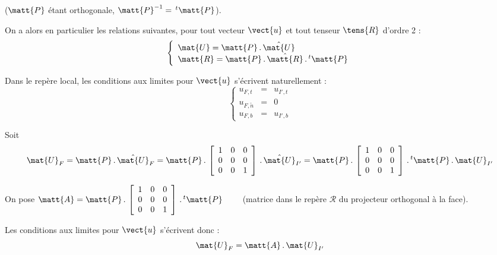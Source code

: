 ($\matt{P}$ \'etant orthogonale, $\matt{P}^{-1}=\,^t\matt{P}$).

On a alors en particulier les relations suivantes, pour tout vecteur $\vect{u}$
et tout tenseur $\tens{R}$ d'ordre 2 :\\
\begin{equation}
\left\{\begin{array}{l}
\mat{U} = \matt{P}\,.\,\hat{\mat{U}}\\
\matt{R}= \matt{P}\,.\,\hat{\matt{R}}\,.\,^t\matt{P}
\end{array}\right.
\end{equation}

Dans le rep\`ere local, les conditions aux limites pour $\vect{u}$ s'\'ecrivent
naturellement :\\
\begin{equation}
\left\{\begin{array}{lcl}
u_{F,t} & = & u_{I',t}\\
u_{F,\tilde{n}} & = & 0\\
u_{F,b} & = & u_{I',b}
\end{array}\right.
\end{equation}

Soit
\begin{equation}
\mat{U}_F = \matt{P}\,.\,\hat{\mat{U}}_F
= \matt{P}\,.\,\left[
\begin{array}{ccc}
1 & 0 & 0\\
0 & 0 & 0\\
0 & 0 & 1
\end{array}
\right]\,.\,\hat{\mat{U}}_{I'}
=\matt{P}\,.\,\left[
\begin{array}{ccc}
1 & 0 & 0\\
0 & 0 & 0\\
0 & 0 & 1
\end{array}
\right]\,.\,^t\matt{P}\,.\,\mat{U}_{I'}
\end{equation}


On pose
$\matt{A}=\matt{P}\,.\,\left[
\begin{array}{ccc}
1 & 0 & 0\\
0 & 0 & 0\\
0 & 0 & 1
\end{array}
\right]\,.\,^t\matt{P}\qquad$ (matrice dans le rep\`ere $\mathcal{R}$ du projecteur
orthogonal \`a la face).

Les conditions aux limites pour $\vect{u}$ s'\'ecrivent donc :
\begin{equation}
\mat{U}_F = \matt{A}\,.\,\mat{U}_{I'}
\end{equation}

